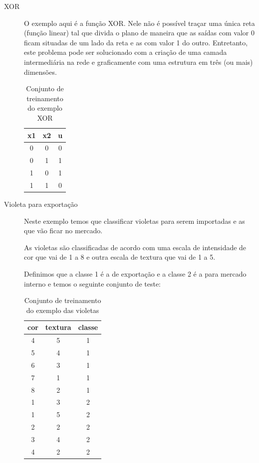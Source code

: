 \documentclass[brazil, a4paper]{article}
\begin{document}
\begin{description}

    \item[XOR] O exemplo aqui é a função XOR. Nele não é possível traçar uma
	única reta (função linear) tal que divida o plano de maneira que as saídas com
	valor 0 ficam situadas de um lado da reta e as com valor 1 do outro. Entretanto,
	este problema pode ser solucionado com a criação de uma camada intermediária na
	rede e graficamente com uma estrutura em três (ou mais) dimensões.
	
		\begin{table}[h]
			\centering
			\begin{tabular}{|c|c|c|}
			\hline
			x1 & x2 & u \\ \hline
			0 & 0 & 0 \\
			0 & 1 & 1 \\
			1 & 0 & 1 \\
			1 & 1 & 0 \\ \hline
			\end{tabular}
			\caption{Conjunto de treinamento do exemplo XOR}
		\end{table}
		
	\item[Violeta para exportação]
	
	Neste exemplo temos que classificar violetas para serem importadas e as que
	vão ficar no mercado.
	
	As violetas são classificadas de acordo com uma escala de intensidade de cor
	que vai de 1 a 8 e outra escala de textura que vai de 1 a 5.
	
	Definimos que a classe 1 é a de exportação e a classe 2 é a para mercado
	interno e temos o seguinte conjunto de teste:

	\begin{table}[h]
			\centering
			\begin{tabular}{|c|c|c|}
			\hline
			cor & textura & classe \\ \hline
			4 &5 & 1 \\
			5 & 4 & 1 \\
			6 & 3 & 1 \\
			7 & 1 & 1 \\
			8 & 2 & 1 \\
			1 & 3 & 2 \\
			1 & 5 & 2 \\
			2 & 2 & 2 \\
			3 & 4 & 2 \\
			4 & 2 & 2 \\ \hline
			\end{tabular}
			\caption{Conjunto de treinamento do exemplo das violetas}
		\end{table}


\end{description}
\end{document}
